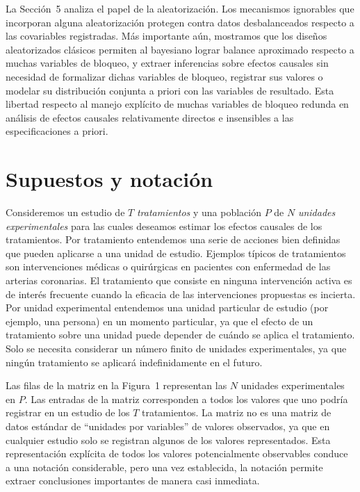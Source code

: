\documentclass[12pt,a4paper]{article}
\begin{document}
La Sección~5 analiza el papel de la aleatorización. Los mecanismos ignorables que
incorporan alguna aleatorización protegen contra datos desbalanceados respecto a las
covariables registradas. Más importante aún, mostramos que los diseños aleatorizados
clásicos permiten al bayesiano lograr balance aproximado respecto a muchas variables de
bloqueo, y extraer inferencias sobre efectos causales sin necesidad de formalizar dichas
variables de bloqueo, registrar sus valores o modelar su distribución conjunta a priori con
las variables de resultado. Esta libertad respecto al manejo explícito de muchas variables
de bloqueo redunda en análisis de efectos causales relativamente directos e insensibles a
las especificaciones a priori.

\section{Supuestos y notación}

Consideremos un estudio de $T$ \textit{tratamientos} y una población $P$ de $N$
\textit{unidades experimentales} para las cuales deseamos estimar los efectos causales de
los tratamientos. Por tratamiento entendemos una serie de acciones bien definidas que
pueden aplicarse a una unidad de estudio. Ejemplos típicos de tratamientos son
intervenciones médicas o quirúrgicas en pacientes con enfermedad de las arterias coronarias.
El tratamiento que consiste en ninguna intervención activa es de interés frecuente cuando
la eficacia de las intervenciones propuestas es incierta. Por unidad experimental
entendemos una unidad particular de estudio (por ejemplo, una persona) en un momento
particular, ya que el efecto de un tratamiento sobre una unidad puede depender de cuándo
se aplica el tratamiento. Solo se necesita considerar un número finito de unidades
experimentales, ya que ningún tratamiento se aplicará indefinidamente en el futuro.

Las filas de la matriz en la Figura~1 representan las $N$ unidades experimentales en $P$.
Las entradas de la matriz corresponden a todos los valores que uno podría registrar en un
estudio de los $T$ tratamientos. La matriz no es una matriz de datos estándar de
``unidades por variables'' de valores observados, ya que en cualquier estudio solo se
registran algunos de los valores representados. Esta representación explícita de todos los
valores potencialmente observables conduce a una notación considerable, pero una vez
establecida, la notación permite extraer conclusiones importantes de manera casi inmediata.
\end{document}

